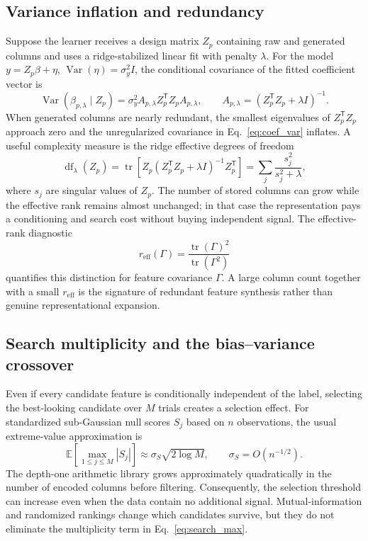 \documentclass[preprint,12pt]{elsarticle}
\begin{document}
\subsection{Variance inflation and redundancy}
Suppose the learner receives a design matrix $Z_p$ containing raw and generated columns and uses a ridge-stabilized linear fit with penalty $\lambda$.  For the model $y=Z_p\beta+\eta$, $\operatorname{Var}(\eta)=\sigma_y^2I$, the conditional covariance of the fitted coefficient vector is \citep{hastie2009,zou2005}
\begin{equation}
  \operatorname{Var}(\widehat\beta_{p,\lambda}\mid Z_p)
  =\sigma_y^2 A_{p,\lambda}Z_p^{\mathsf T}Z_pA_{p,\lambda},
  \qquad A_{p,\lambda}=(Z_p^{\mathsf T}Z_p+\lambda I)^{-1}.
  \label{eq:coef_var}
\end{equation}
When generated columns are nearly redundant, the smallest eigenvalues of $Z_p^{\mathsf T}Z_p$ approach zero and the unregularized covariance in Eq.~\eqref{eq:coef_var} inflates.  A useful complexity measure is the ridge effective degrees of freedom
\begin{equation}
  \operatorname{df}_{\lambda}(Z_p)=\operatorname{tr}\!\left[Z_p(Z_p^{\mathsf T}Z_p+\lambda I)^{-1}Z_p^{\mathsf T}\right]
  =\sum_{j}\frac{s_j^2}{s_j^2+\lambda},
  \label{eq:effective_df}
\end{equation}
where $s_j$ are singular values of $Z_p$.  The number of stored columns can grow while the effective rank remains almost unchanged; in that case the representation pays a conditioning and search cost without buying independent signal.  The effective-rank diagnostic
\begin{equation}
  r_{\mathrm{eff}}(\Gamma)=\frac{\operatorname{tr}(\Gamma)^2}{\operatorname{tr}(\Gamma^2)}
\end{equation}
quantifies this distinction for feature covariance $\Gamma$.  A large column count together with a small $r_{\mathrm{eff}}$ is the signature of redundant feature synthesis rather than genuine representational expansion.

\subsection{Search multiplicity and the bias--variance crossover}
Even if every candidate feature is conditionally independent of the label, selecting the best-looking candidate over $M$ trials creates a selection effect.  For standardized sub-Gaussian null scores $S_j$ based on $n$ observations, the usual extreme-value approximation is
\begin{equation}
  \mathbb{E}\left[\max_{1\le j\le M}|S_j|\right]
  \approx \sigma_S\sqrt{2\log M},
  \qquad \sigma_S=O(n^{-1/2}).
  \label{eq:search_max}
\end{equation}
The depth-one arithmetic library grows approximately quadratically in the number of encoded columns before filtering.  Consequently, the selection threshold can increase even when the data contain no additional signal.  Mutual-information and randomized rankings change which candidates survive, but they do not eliminate the multiplicity term in Eq.~\eqref{eq:search_max}.
\end{document}
